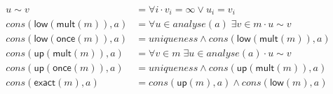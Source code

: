 \begin{align*}
  u \sim v &= \forall i \cdot v_i = \infty \vee u_i = v_i \\
  cons(\textsf{low}(\textsf{mult}(m)),a) &=
    \forall u \in analyse(a) \; \exists v \in m \cdot u \sim v \\
  cons(\textsf{low}(\textsf{once}(m)),a) &=
    uniqueness \wedge cons(\textsf{low}(\textsf{mult}(m)),a)  \\
  cons(\textsf{up}(\textsf{mult}(m)),a) &=
    \forall v \in m \; \exists u \in analyse(a) \cdot u \sim v \\
  cons(\textsf{up}(\textsf{once}(m)),a) &=
    uniqueness \wedge cons(\textsf{up}(\textsf{mult}(m)),a) \\
  cons(\textsf{exact}(m),a) &=
    cons(\textsf{up}(m),a) \wedge cons(\textsf{low}(m),a)
\end{align*}
